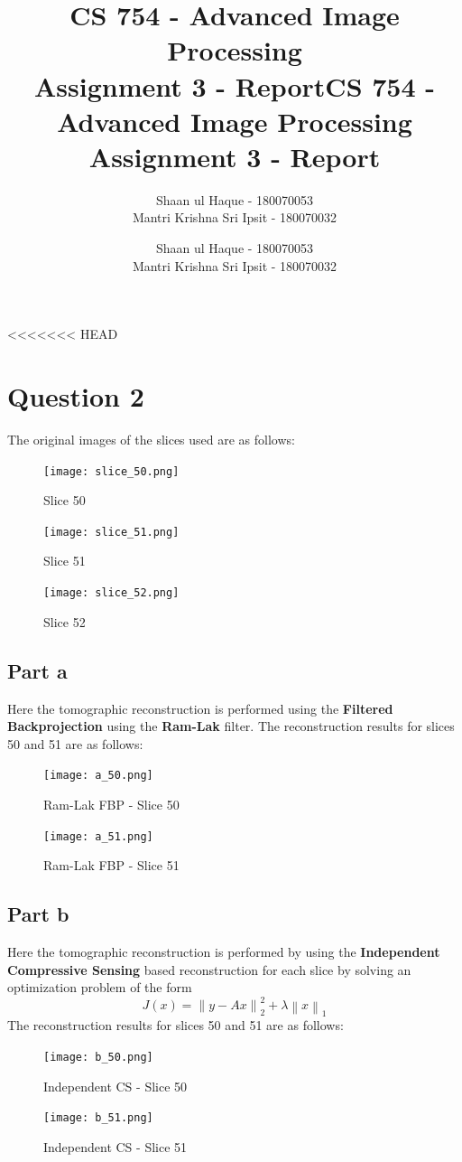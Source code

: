 \documentclass[12pt]{article}
\title{CS 754 - Advanced Image Processing\\Assignment 3 - Report}
\author{Shaan ul Haque - 180070053\\Mantri Krishna Sri Ipsit - 180070032}
\title{CS 754 - Advanced Image Processing\\Assignment 3 - Report}
\author{Shaan ul Haque - 180070053\\Mantri Krishna Sri Ipsit - 180070032}
\newcommand{\norm}[1]{\left\lVert #1 \right\rVert}
\begin{document}
\maketitle

<<<<<<< HEAD
\section*{Question 2}
The original images of the slices used are as follows:
\begin{figure}[ht]
	\centering
	\begin{minipage}[bt]{0.3\linewidth}
		\centering
			\texttt{[image: slice\_50.png]}
			\caption{Slice 50}
	\end{minipage}
\begin{minipage}[bt]{0.3\linewidth}
	\centering
	\texttt{[image: slice\_51.png]}
	\caption{Slice 51}
\end{minipage}
\begin{minipage}[bt]{0.3\linewidth}
	\centering
	\texttt{[image: slice\_52.png]}
	\caption{Slice 52}
\end{minipage}
\end{figure}
\subsection*{Part a}
Here the tomographic reconstruction is performed using the \textbf{Filtered Backprojection} using the \textbf{Ram-Lak} filter. The reconstruction results for slices 50 and 51 are as follows:
\begin{figure}[ht]
	\centering
	\begin{minipage}[bt]{0.5\linewidth}
		\centering
		\texttt{[image: a\_50.png]}
		\caption{Ram-Lak FBP - Slice 50}
	\end{minipage}
	\begin{minipage}[bt]{0.4\linewidth}
		\centering
		\texttt{[image: a\_51.png]}
		\caption{Ram-Lak FBP - Slice 51}
	\end{minipage}
\end{figure}
\subsection*{Part b}
Here the tomographic reconstruction is performed by using the \textbf{Independent Compressive Sensing} based reconstruction for each slice by solving an optimization problem of the form
$$J(x) = \norm{y - Ax}_2^2 + \lambda \norm{x}_1$$
The reconstruction results for slices 50 and 51 are as follows:
\begin{figure}[ht]
	\centering
	\begin{minipage}[bt]{0.5\linewidth}
		\centering
		\texttt{[image: b\_50.png]}
		\caption{Independent CS - Slice 50}
	\end{minipage}
	\begin{minipage}[bt]{0.4\linewidth}
		\centering
		\texttt{[image: b\_51.png]}
		\caption{Independent CS - Slice 51}
	\end{minipage}
\end{figure}
\end{document}
